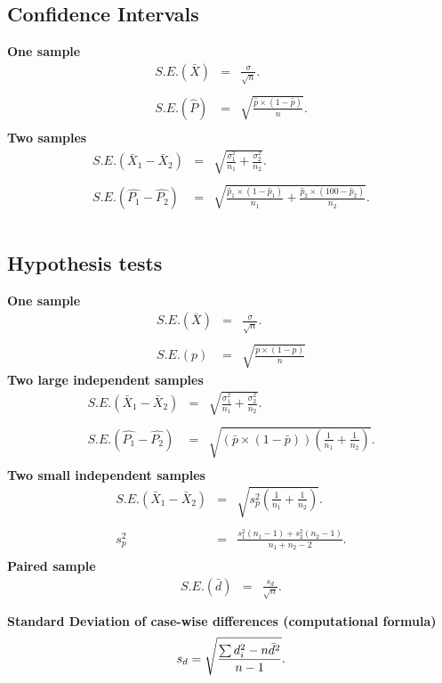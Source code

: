 \documentclass[a4paper,12pt]{article}
\begin{document}
\newpage 
\subsection*{Confidence Intervals}
{\bf One sample}
\begin{eqnarray*} S.E.(\bar{X})&=&\frac{\sigma}{\sqrt{n}}.\\\\
	S.E.(\hat{P})&=&\sqrt{\frac{\hat{p}\times(1-\hat{p})}{n}}.\\
\end{eqnarray*}
{\bf Two samples}
\begin{eqnarray*}
	S.E.(\bar{X}_1-\bar{X}_2)&=&\sqrt{\frac{\sigma^2_1}{n_1}+\frac{\sigma_2^2}{n_2}}.\\\\
	S.E.(\hat{P_1}-\hat{P_2})&=&\sqrt{\frac{\hat{p}_1\times(1-\hat{p}_1)}{n_1}+\frac{\hat{p}_2\times(100-\hat{p}_2)}{n_2}}.\\\\
\end{eqnarray*}
\subsection*{Hypothesis tests}
{\bf One sample}
\begin{eqnarray*}
	S.E.(\bar{X})&=&\frac{\sigma}{\sqrt{n}}.\\\\
	S.E.(p)&=&\sqrt{\frac{p \times(1-p)}{n}}
\end{eqnarray*}
{\bf Two large independent samples}
\begin{eqnarray*}
	S.E.(\bar{X}_1-\bar{X}_2)&=&\sqrt{\frac{\sigma^2_1}{n_1}+\frac{\sigma_2^2}{n_2}}.\\\\
	S.E.(\hat{P_1}-\hat{P_2})&=&\sqrt{\left(\bar{p}\times(1-\bar{p})\right)\left(\frac{1}{n_1}+\frac{1}{n_2}\right)}.\\
\end{eqnarray*}
{\bf Two small independent samples}
\begin{eqnarray*}
	S.E.(\bar{X}_1-\bar{X}_2)&=&\sqrt{s_p^2\left(\frac{1}{n_1}+\frac{1}{n_2}\right)}.\\\\
	s_p^2&=&\frac{s_1^2(n_1-1)+s_2^2(n_2-1)}{n_1+n_2-2}.\\
\end{eqnarray*}
{\bf Paired sample}
\begin{eqnarray*}
	S.E.(\bar{d})&=&\frac{s_d}{\sqrt{n}}.\\\\
\end{eqnarray*}
{\bf Standard Deviation of case-wise differences (computational formula)}
\begin{eqnarray*}
	s_d = \sqrt{ {\sum d_i^2 - n\bar{d}^2 \over n-1}}.\\\\
\end{eqnarray*}
\end{document}
